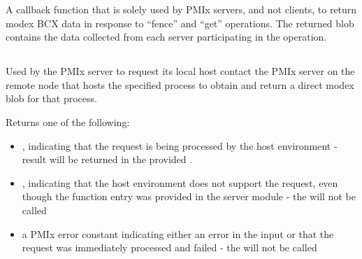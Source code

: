 A callback function that is solely used by PMIx servers, and not clients, to return modex \ac{BCX} data in response to ``fence'' and ``get'' operations.
The returned blob contains the data collected from each server participating in the operation.


\subsection{}

\summary

Used by the PMIx server to request its local host contact the \ac{PMIx} server on the remote node that hosts the specified process to obtain and return a direct modex blob for that process.

\format


\begin{arglist}
\end{arglist}

Returns one of the following:

\begin{itemize}
    \item {}, indicating that the request is being processed by the host environment - result will be returned in the provided .
    \item {}, indicating that the host environment does not support the request, even though the function entry was provided in the server module - the  will not be called
    \item a PMIx error constant indicating either an error in the input or that the request was immediately processed and failed - the  will not be called
\end{itemize}


